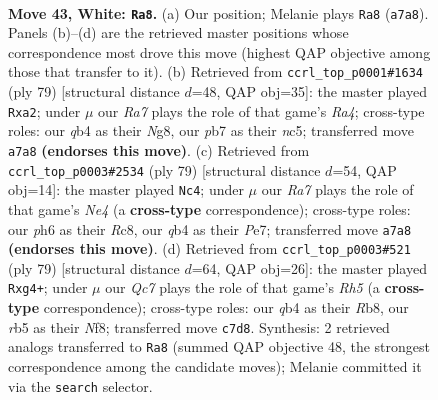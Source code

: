 \documentclass[11pt]{article}
\begin{document}
\clearpage

\begin{figure}[p]\centering
\begin{subfigure}{0.46\textwidth}\centering
\resizebox{\linewidth}{!}{%
\newchessgame
\chessboard[
  setfen={5n1k/RpQ4p/7p/1r6/1q6/6NK/8/7R w - - 3 43},
  showmover=false,
  pgfstyle=straightmove, color=movearrow, markmove={a7-a8}
]}
\caption{}
\end{subfigure}\hfill
\begin{subfigure}{0.46\textwidth}\centering
\resizebox{\linewidth}{!}{%
\newchessgame
\chessboard[
  setfen={6nk/2q4n/8/r1N5/3P2Q1/2P3P1/P7/5RK1 b - - 0 40},
  showmover=false,
  pgfstyle=straightmove, color=movearrow, markmove={a5-a2}
]}
\caption{}
\end{subfigure}
\\[4pt]
\begin{subfigure}{0.46\textwidth}\centering
\resizebox{\linewidth}{!}{%
\newchessgame
\chessboard[
  setfen={2r4k/4pp1q/8/4n3/8/1NP2PR1/2PQ2K1/8 b - - 2 40},
  showmover=false,
  pgfstyle=straightmove, color=movearrow, markmove={e5-c4}
]}
\caption{}
\end{subfigure}\hfill
\begin{subfigure}{0.46\textwidth}\centering
\resizebox{\linewidth}{!}{%
\newchessgame
\chessboard[
  setfen={1r3nk1/8/2R1p3/2P5/5pPr/3N4/P5K1/R7 b - - 0 40},
  showmover=false,
  pgfstyle=straightmove, color=movearrow, markmove={h4-g4}
]}
\caption{}
\end{subfigure}
\caption{\textbf{Move 43, White: \texttt{Ra8}.} (a) Our position; Melanie plays \texttt{Ra8} (\texttt{a7a8}). Panels (b)--(d) are the retrieved master positions whose correspondence most drove this move (highest QAP objective among those that transfer to it). (b) Retrieved from \texttt{ccrl\_top\_p0001\#1634} (ply 79) [structural distance $d$=48, QAP obj=35]: the master played \texttt{Rxa2}; under $\mu$ our \emph{Ra7} plays the role of that game's \emph{Ra4}; cross-type roles: our \emph{q}b4 as their \emph{N}g8, our \emph{p}b7 as their \emph{n}c5; transferred move \texttt{a7a8} \textbf{(endorses this move)}. (c) Retrieved from \texttt{ccrl\_top\_p0003\#2534} (ply 79) [structural distance $d$=54, QAP obj=14]: the master played \texttt{Nc4}; under $\mu$ our \emph{Ra7} plays the role of that game's \emph{Ne4} (a \textbf{cross-type} correspondence); cross-type roles: our \emph{p}h6 as their \emph{R}c8, our \emph{q}b4 as their \emph{P}e7; transferred move \texttt{a7a8} \textbf{(endorses this move)}. (d) Retrieved from \texttt{ccrl\_top\_p0003\#521} (ply 79) [structural distance $d$=64, QAP obj=26]: the master played \texttt{Rxg4+}; under $\mu$ our \emph{Qc7} plays the role of that game's \emph{Rh5} (a \textbf{cross-type} correspondence); cross-type roles: our \emph{q}b4 as their \emph{R}b8, our \emph{r}b5 as their \emph{N}f8; transferred move \texttt{c7d8}. Synthesis: 2 retrieved analogs transferred to \texttt{Ra8} (summed QAP objective 48, the strongest correspondence among the candidate moves); Melanie committed it via the \texttt{search} selector.}
\label{fig:thought-m84}
\end{figure}
\end{document}
